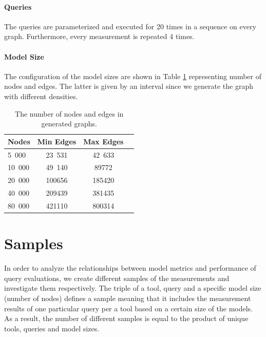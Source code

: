 \paragraph{Queries}
The queries are parameterized and executed for 20 times in a sequence on every graph. Furthermore, every measurement is repeated 4 times.

\paragraph{Model Size}

The configuration of the model sizes are shown in Table \ref{tab:graph_size} representing number of nodes and edges. The latter is given by an interval since we generate the graph with different densities.

\begin{table}[ht]
	\footnotesize
	\centering
	
	\begin{tabular}{ l c c c}
		\toprule
		Nodes & Min Edges & Max Edges \\ \hline
		5~000 & 23~531 & 42~633\\ \hline
		10~000 & 49~140 & 89772\\ \hline	
		20~000 & 100656 & 185420\\ \hline
		40~000 & 209439 & 381435\\ \hline
		80~000 & 421110 & 800314\\ \hline
		\bottomrule
	\end{tabular}
	\caption{The number of nodes and edges in generated graphs.}
	\label{tab:graph_size}
\end{table}

\section{Samples}

In order to analyze the relationships between model metrics and performance of query evaluations, we create different samples of the measurements and investigate them respectively. The triple of a tool, query and a specific model size (number of nodes) defines a sample meaning that it includes the measurement results of one particular query per a tool based on a certain size of the models. As a result, the number of different samples is equal to the product of unique tools, queries and model sizes.


